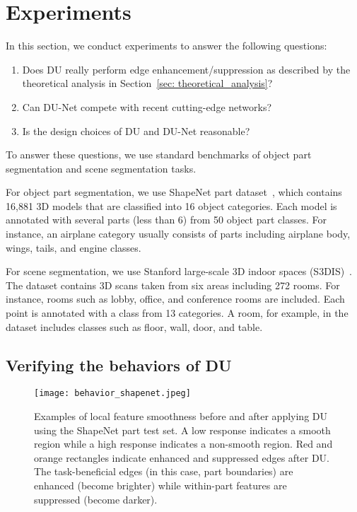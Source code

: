 \documentclass[a4paper,fleqn]{cas-dc}
\begin{document}
\section{Experiments}
\label{sec: exp}
In this section, we conduct experiments to answer the following questions:

\begin{enumerate}
\item Does DU really perform edge enhancement/suppression as described by the theoretical analysis in Section~\ref{sec: theoretical_analysis}?
\item Can DU-Net compete with recent cutting-edge networks?
\item Is the design choices of DU and DU-Net reasonable?
\end{enumerate}
To answer these questions, we use standard benchmarks of object part segmentation and scene segmentation tasks.




For object part segmentation, we use ShapeNet part dataset~\cite{yi2016scalable}, which contains 16,881 3D models that are classified into 16 object categories. Each model is annotated with several parts (less than 6) from 50 object part classes. For instance, an airplane category usually consists of parts including airplane body, wings, tails, and engine classes. 



For scene segmentation, we use Stanford large-scale 3D indoor spaces (S3DIS)~\cite{armeni20163d}. The dataset contains 3D scans taken from six areas including 272 rooms. For instance, rooms such as lobby, office, and conference rooms are included. Each point is annotated with a class from 13 categories. A room, for example, in the dataset includes classes such as floor, wall, door, and table.      
\subsection{Verifying the behaviors of DU}
\label{sec: interpretation}
\begin{figure}[t]
    \centering 
        \texttt{[image: behavior\_shapenet.jpeg]}
    \caption{
    Examples of local feature smoothness before and after applying DU using the ShapeNet part test set. A low response indicates a smooth region while a high response indicates a non-smooth region. Red and orange rectangles indicate enhanced and suppressed edges after DU. The task-beneficial edges (in this case, part boundaries) are enhanced (become brighter) while within-part features are suppressed (become darker). 
    }
    \label{fig: behavior_shapenet}
\end{figure}
\end{document}
